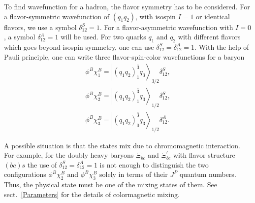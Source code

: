 \documentclass[prt,twocolumn,floatfix,nofootinbib]{revtex4}
\begin{document}
To find wavefunction for a hadron, the flavor symmetry has to be considered. For a flavor-symmetric wavefunction of $\left(q_{1}q_{2}\right)$, with isospin $I=1$ or identical flavors, we use a symbol $\delta_{12}^{S}=1$.
For a flavor-asymmetric wavefunction with $I=0$, a symbol $\delta_{12}^{A}=1$ will be used. For two quarks $q_{1}$ and $q_{2}$ with different flavors which goes beyond isospin symmetry, one can use $\delta_{12}^{S}=\delta_{12}^{A}=1$.
With the help of Pauli principle, one can write three flavor-spin-color wavefunctions for a baryon
\begin{equation}\label{colorspinB}
    \begin{aligned}
        \phi^{B}\chi_{1}^{B}={\left| {\left(q_{1}q_{2}\right)}_{1}^{\bar{3}} q_{3} \right\rangle}_{3/2} \delta_{12}^{S}, \\
        \phi^{B}\chi_{2}^{B}={\left| {\left(q_{1}q_{2}\right)}_{1}^{\bar{3}} q_{3} \right\rangle}_{1/2} \delta_{12}^{S}, \\
        \phi^{B}\chi_{3}^{B}={\left| {\left(q_{1}q_{2}\right)}_{0}^{\bar{3}} q_{3} \right\rangle}_{1/2} \delta_{12}^{A}.
    \end{aligned}
\end{equation}

A possible situation is that the states mix due to chromomagnetic interaction.
For example, for the doubly heavy baryons $\Xi_{bc}$ and $\Xi_{bc}^{\prime}$ with flavor structure $(bc)s$ the use of $\delta_{12}^{S}=\delta_{12}^{A}=1$ is not enough to distinguish the two configurations $\phi^{B}\chi_{2}^{B}$ and $\phi^{B}\chi_{3}^{B}$ solely in terms of their $J^{P}$ quantum numbers. Thus, the physical state must be one of the mixing states of them. See sect.~\ref{Parameters} for the details of colormagnetic mixing.
\end{document}
